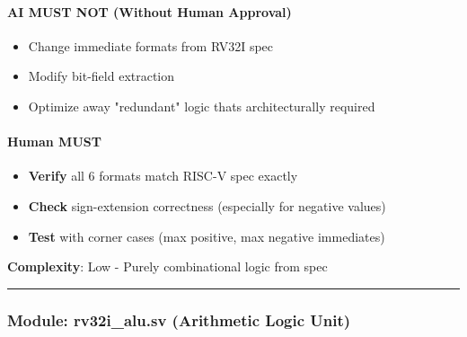 \paragraph{\texorpdfstring{\warn{} AI MUST NOT (Without Human
Approval)}{ AI MUST NOT (Without Human Approval)}}\label{cr:status:phase1-ai-human-responsibilities:warning-ai-must-not-without-human-approval-1}

\begin{record}

\begin{itemize}
\tightlist
\item
  Change immediate formats from RV32I spec
\item
  Modify bit-field extraction
\item
  Optimize away "redundant" logic that\textquotesingle s architecturally
  required
\end{itemize}

\end{record}

\paragraph{\texorpdfstring{\hold{} Human MUST}{ Human MUST}}\label{cr:status:phase1-ai-human-responsibilities:raised-hand-human-must-1}

\begin{record}

\begin{itemize}
\tightlist
\item
  \textbf{Verify} all 6 formats match RISC-V spec exactly
\item
  \textbf{Check} sign-extension correctness (especially for negative
  values)
\item
  \textbf{Test} with corner cases (max positive, max negative
  immediates)
\end{itemize}

\textbf{Complexity}: \ok{} Low - Purely combinational logic from spec

\begin{center}\rule{0.5\linewidth}{0.5pt}\end{center}

\end{record}

\subsubsection{\texorpdfstring{Module: rv32i\_\allowbreak{}alu.sv
(Arithmetic Logic Unit)}{Module: rv32i\_alu.sv (Arithmetic Logic Unit)}}\label{cr:status:phase1-ai-human-responsibilities:module-rv32i-alusv-arithmetic-logic-unit}


